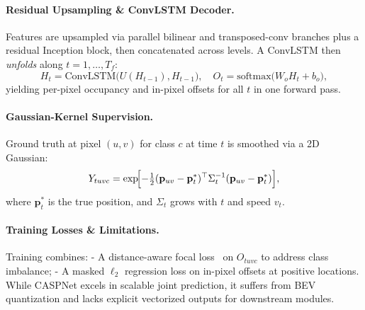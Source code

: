 \paragraph{Residual Upsampling \& ConvLSTM Decoder.} Features are upsampled via
parallel bilinear and transposed-conv branches plus a residual Inception block, then concatenated across levels. A ConvLSTM then {\it unfolds} along $t=1,\dots,T_f$:
\[
H_t = \mathrm{ConvLSTM}\bigl(U(H_{t-1}),H_{t-1}\bigr),\quad
O_t = \mathrm{softmax}\bigl(W_o H_t + b_o\bigr),
\]
yielding per-pixel occupancy and in-pixel offsets for all $t$ in one forward pass.

\paragraph{Gaussian-Kernel Supervision.} Ground truth at pixel $(u,v)$ for class $c$ at time $t$ is smoothed via a 2D Gaussian:
\[
Y_{tuvc} = \exp\!\Bigl[-\tfrac12(\mathbf{p}_{uv}-\mathbf{p}^*_t)^\top\Sigma_t^{-1}(\mathbf{p}_{uv}-\mathbf{p}^*_t)\Bigr],
\]
where $\mathbf{p}^*_t$ is the true position, and $\Sigma_t$ grows with $t$ and speed $v_t$.

\paragraph{Training Losses \& Limitations.} Training combines:
- A distance-aware focal loss~\cite{Law_2018_ECCV} on $O_{tuvc}$ to address class imbalance;
- A masked $\ell_2$ regression loss on in-pixel offsets at positive locations.
While CASPNet excels in scalable joint prediction, it suffers from BEV quantization and lacks explicit vectorized outputs for downstream modules.


